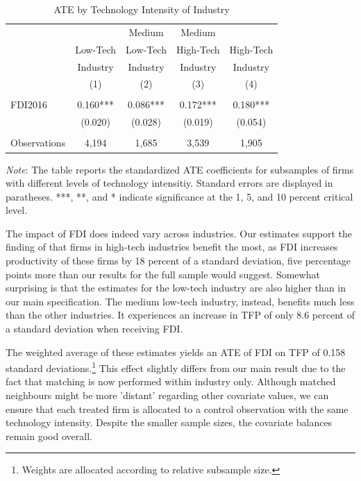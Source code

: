 \documentclass[a4paper,11pt]{scrartcl}
\begin{document}
\begin{table}[h!]
  \centering
   \caption{ATE by Technology Intensity of Industry}
   \label{tab:TECH}
\begin{threeparttable}
 
\begin{tabular}{lcccc}
 \hline
 \hline
 & & Medium & Medium &  \\ 
 & Low-Tech & Low-Tech & High-Tech & High-Tech \\ 
 & Industry & Industry & Industry & Industry \\ 
 & (1) & (2) & (3) & (4) \\
 \hline
 &  &  &  &  \\
FDI2016 & 0.160*** & 0.086*** & 0.172*** & 0.180*** \\
	      & (0.020) & (0.028) & (0.019) & (0.054) \\
	      &  &  &  &  \\
 Observations & 4,194 & 1,685 & 3,539 & 1,905 \\ 
	\hline
	\hline
\end{tabular}	

\begin{tablenotes}[flushleft]
     \footnotesize       
\item \textit{Note}: The table reports the standardized ATE coefficients for subsamples of firms with different levels of technology intensitiy. Standard errors are displayed in paratheses. ***, **, and * indicate significance at the 1, 5, and 10 percent critical level. 

\end{tablenotes}


\end{threeparttable}
\end{table}

The impact of FDI does indeed vary across industries. Our estimates support the finding of \citet{Keller2009} that firms in high-tech industries benefit the most, as FDI increases productivity of these firms by 18 percent of a standard deviation, five percentage points more than our results for the full sample would suggest. Somewhat surprising is that the estimates for the low-tech industry are also higher than in our main specification. The medium low-tech industry, instead, benefits much less than the other industries. It experiences an increase in TFP of only 8.6 percent of a standard deviation when receiving FDI. 

The weighted average of these estimates yields an ATE of FDI on TFP of 0.158 standard deviations.\footnote{Weights are allocated according to relative subsample size.} This effect slightly differs from our main result due to the fact that matching is now performed within industry only. Although matched neighbours might be more 'distant' regarding other covariate values, we can ensure that each treated firm is allocated to a control observation with the same technology intensity. Despite the smaller sample sizes, the covariate balances remain good overall. \\
\end{document}
